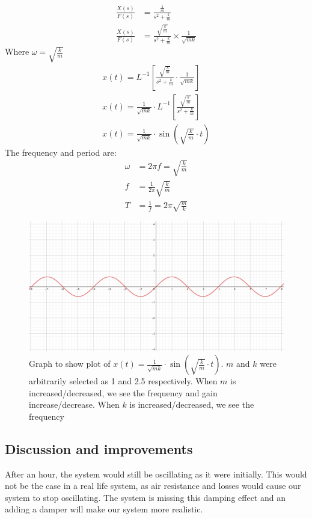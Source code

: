 \documentclass[12pt]{article}
\numberwithin{equation}{section}
\begin{document}
\begin{align}
  \frac{X(s)}{F(s)} &= \frac{\frac{1}{m}}{s^2 + \frac{k}{m}}\\
  \frac{X(s)}{F(s)} &= \frac{\sqrt{\frac{k}{m}}}{s^2 + \frac{k}{m}} \times \frac{1}{\sqrt{mk}}
\end{align}
Where $\omega = \sqrt{\frac{k}{m}}$
\begin{align}
  x(t) = L^{-1} \left[ \frac{\sqrt{\frac{k}{m}}}{s^2 + \frac{k}{m}} \cdot \frac{1}{\sqrt{mk}} \right]\\
  x(t) = \frac{1}{\sqrt{mk}} \cdot L^{-1} \left[ \frac{\sqrt{\frac{k}{m}}}{s^2 + \frac{k}{m}} \right]\\
  x(t) = \frac{1}{\sqrt{mk}} \cdot \sin{\left(\sqrt{\frac{k}{m}}\cdot t\right)}
\end{align}
The frequency and period are:
\begin{align}
  \omega &= 2\pi f = \sqrt{\frac{k}{m}}\\
  f &= \frac{1}{2\pi}\sqrt{\frac{k}{m}}\\
  T &= \frac{1}{f} = 2\pi\sqrt{\frac{m}{k}}
\end{align}
\begin{figure}[H]
  \centering
  \includegraphics[width=\textwidth]{./img/3-1timeresponse.png}
  \caption{Graph to show plot of $x(t) = \frac{1}{\sqrt{mk}} \cdot \sin{\left(\sqrt{\frac{k}{m}}\cdot t\right)}$. $m$ and $k$ were arbitrarily selected as 1 and 2.5 respectively. When $m$ is increased/decreased, we see the frequency and gain increase/decrease. When $k$ is increased/decreased, we see the frequency }
\end{figure}
\subsection{Discussion and improvements}
After an hour, the system would still be oscillating as it were initially. This would not be the case in a real life system, as air resistance and losses would cause our system to stop oscillating. The system is missing this damping effect and an adding a damper will make our system more realistic.
\end{document}
